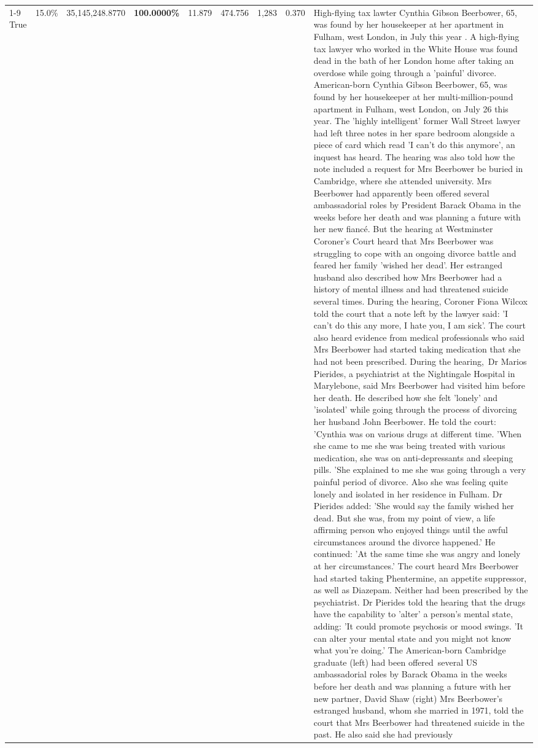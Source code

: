 \begin{table}[H]
\begin{tabular}{lllrlllll}
\cline{1-9}
True & 15.0\% & 35,145,248.8770 & \bfseries \color{red} 100.0000\% & 11.879 & 474.756 & 1,283 & 0.370 & High-flying tax lawter Cynthia Gibson Beerbower, 65, was found by her housekeeper at her apartment in Fulham, west London, in July this year . A high-flying tax lawyer who worked in the White House was found dead in the bath of her London home after taking an overdose while going through a 'painful' divorce. American-born Cynthia Gibson Beerbower, 65, was found by her housekeeper at her multi-million-pound apartment in Fulham, west London, on July 26 this year. The 'highly intelligent' former Wall Street lawyer had left three notes in her spare bedroom alongside a piece of card which read 'I can't do this anymore', an inquest has heard. The hearing was also told how the note included a request for Mrs Beerbower be buried in Cambridge, where she attended university. Mrs Beerbower had apparently been offered several ambassadorial roles by President Barack Obama in the weeks before her death and was planning a future with her new fiancé. But the hearing at Westminster Coroner's Court heard that Mrs Beerbower was struggling to cope with an ongoing divorce battle and feared her family 'wished her dead'. Her estranged husband also described how Mrs Beerbower had a history of mental illness and had threatened suicide several times. During the hearing, Coroner Fiona Wilcox told the court that a note left by the lawyer said: 'I can't do this any more, I hate you, I am sick'. The court also heard evidence from medical professionals who said Mrs Beerbower had started taking medication that she had not been prescribed. During the hearing, Dr Marios Pierides, a psychiatrist at the Nightingale Hospital in Marylebone, said Mrs Beerbower had visited him before her death. He described how she felt 'lonely' and 'isolated' while going through the process of divorcing her husband John Beerbower. He told the court: 'Cynthia was on various drugs at different time. 'When she came to me she was being treated with various medication, she was on anti-depressants and sleeping pills. 'She explained to me she was going through a very painful period of divorce. Also she was feeling quite lonely and isolated in her residence in Fulham. Dr Pierides added: 'She would say the family wished her dead. But she was, from my point of view, a life affirming person who enjoyed things until the awful circumstances around the divorce happened.' He continued: 'At the same time she was angry and lonely at her circumstances.' The court heard Mrs Beerbower had started taking Phentermine, an appetite suppressor, as well as Diazepam. Neither had been prescribed by the psychiatrist. Dr Pierides told the hearing that the drugs have the capability to 'alter' a person's mental state, adding: 'It could promote psychosis or mood swings. 'It can alter your mental state and you might not know what you're doing.' The American-born Cambridge graduate (left) had been offered several US ambassadorial roles by Barack Obama in the weeks before her death and was planning a future with her new partner, David Shaw (right) Mrs Beerbower's estranged husband, whom she married in 1971, told the court that Mrs Beerbower had threatened suicide in the past. He also said she had previously 
\end{tabular}
\end{table}
